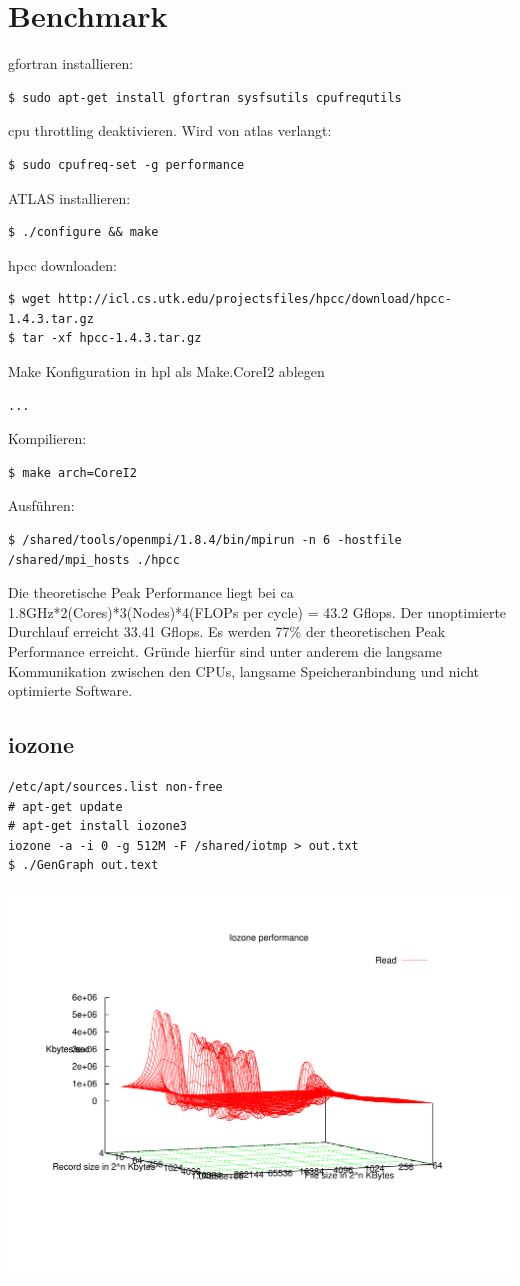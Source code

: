 \chapter{Benchmark}
gfortran installieren:
\begin{lstlisting}[style=Bash]
$ sudo apt-get install gfortran sysfsutils cpufrequtils
\end{lstlisting}
cpu throttling deaktivieren. Wird von atlas verlangt:
\begin{lstlisting}[style=Bash]
$ sudo cpufreq-set -g performance
\end{lstlisting}
ATLAS installieren:
\begin{lstlisting}[style=Bash]
$ ./configure && make
\end{lstlisting}
hpcc downloaden:
\begin{lstlisting}[style=Bash]
$ wget http://icl.cs.utk.edu/projectsfiles/hpcc/download/hpcc-1.4.3.tar.gz
$ tar -xf hpcc-1.4.3.tar.gz
\end{lstlisting}
Make Konfiguration in hpl als Make.CoreI2 ablegen
\begin{lstlisting}[style=Bash]
...
\end{lstlisting}
Kompilieren:
\begin{lstlisting}[style=Bash]
$ make arch=CoreI2
\end{lstlisting}
Ausführen:
\begin{lstlisting}[style=Bash]
$ /shared/tools/openmpi/1.8.4/bin/mpirun -n 6 -hostfile /shared/mpi_hosts ./hpcc
\end{lstlisting}
Die theoretische Peak Performance liegt bei ca 1.8GHz*2(Cores)*3(Nodes)*4(FLOPs per cycle) = 43.2 Gflops.
Der unoptimierte Durchlauf erreicht 33.41 Gflops. Es werden 77\% der theoretischen Peak Performance erreicht.
Gründe hierfür sind unter anderem die langsame Kommunikation zwischen den CPUs, langsame Speicheranbindung und nicht optimierte Software.\\
\section{iozone}
\begin{lstlisting}[style=Bash]
/etc/apt/sources.list non-free
# apt-get update
# apt-get install iozone3
iozone -a -i 0 -g 512M -F /shared/iotmp > out.txt
$ ./GenGraph out.text
\end{lstlisting}
\includegraphics[scale=0.7]{read.pdf}
